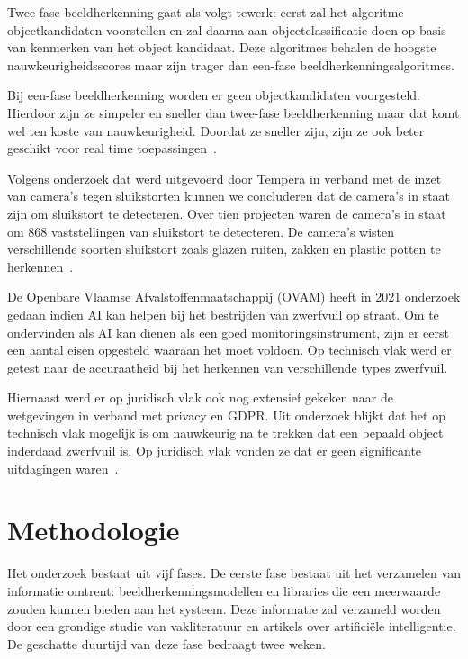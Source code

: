 \documentclass{hogent-article}
\begin{document}
Twee-fase beeldherkenning gaat als volgt tewerk: eerst zal het algoritme objectkandidaten voorstellen en zal daarna aan objectclassificatie doen op basis van kenmerken van het object kandidaat. Deze algoritmes behalen de hoogste nauwkeurigheidsscores maar zijn trager dan een-fase beeldherkenningsalgoritmes.

Bij een-fase beeldherkenning worden er geen objectkandidaten voorgesteld. Hierdoor zijn ze simpeler en sneller dan twee-fase beeldherkenning maar dat komt wel ten koste van nauwkeurigheid. Doordat ze sneller zijn, zijn ze ook beter geschikt voor real time toepassingen~\autocite{Boesch}.

Volgens onderzoek dat werd uitgevoerd door Tempera in verband met de inzet van camera's tegen sluikstorten kunnen we concluderen dat de camera's in staat zijn om sluikstort te detecteren. Over tien projecten waren de camera's in staat om 868 vaststellingen van sluikstort te detecteren. De camera's wisten verschillende soorten sluikstort zoals glazen ruiten, zakken en plastic potten te herkennen~\autocite{Albertijn2019}.

De Openbare Vlaamse Afvalstoffenmaatschappij (OVAM) heeft in 2021 onderzoek gedaan indien AI kan helpen bij het bestrijden van zwerfvuil op straat. Om te ondervinden als AI kan dienen als een goed monitoringsinstrument, zijn er eerst een aantal eisen opgesteld waaraan het moet voldoen. Op technisch vlak werd er getest naar de accuraatheid bij het herkennen van verschillende types zwerfvuil. 

Hiernaast werd er op juridisch vlak ook nog extensief gekeken naar de wetgevingen in verband met privacy en GDPR. Uit onderzoek blijkt dat het op technisch vlak mogelijk is om nauwkeurig na te trekken dat een bepaald object inderdaad zwerfvuil is. Op juridisch vlak vonden ze dat er geen significante uitdagingen waren~\autocite{Berth2011}.
\section{Methodologie}


Het onderzoek bestaat uit vijf fases. De eerste fase bestaat uit het verzamelen van informatie omtrent: beeldherkenningsmodellen en libraries die een meerwaarde zouden kunnen bieden aan het systeem. Deze informatie zal verzameld worden door een grondige studie van vakliteratuur en artikels over artificiële intelligentie. De geschatte duurtijd van deze fase bedraagt twee weken.
\end{document}
